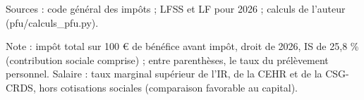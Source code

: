 Sources : code général des impôts ; LFSS et LF pour 2026 ; calculs de l'auteur (pfu/calculs\_pfu.py).\par Note : impôt total sur 100 \euro{} de bénéfice avant impôt, droit de 2026, IS de 25,8 \% (contribution sociale comprise) ; entre parenthèses, le taux du prélèvement personnel. Salaire : taux marginal supérieur de l'IR, de la CEHR et de la CSG-CRDS, hors cotisations sociales (comparaison favorable au capital).
